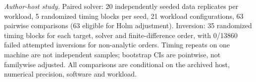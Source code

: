 \noindent\textit{Author-host study.} 
Paired solver: 20 independently seeded data replicates per workload, 5 randomized timing blocks per seed, 
21 workload configurations, 63 pairwise comparisons (63 eligible for Holm adjustment). Inversion: 
35 randomized timing blocks for each target, solver and finite-difference order, with 
0/13860 failed attempted inversions for non-analytic orders. Timing repeats on one machine are not independent samples; bootstrap CIs are pointwise, not familywise adjusted. All comparisons are conditional on the archived host, numerical precision, software and workload. 
